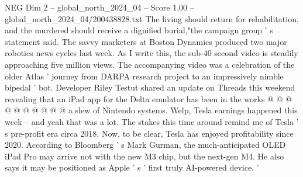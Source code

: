 \begin{textsample}{NEG Dim 2 – global\_north\_2024\_04 – Score 1.00 – global\_north\_2024\_04/200438828.txt}
The living should return for rehabilitation, and the murdered should receive a dignified burial,"the campaign group ' s statement said.
The savvy marketers at Boston Dynamics produced two major robotics news cycles last week.
As I write this, the sub-40 second video is steadily approaching five million views.
The accompanying video was a celebration of the older Atlas ' journey from DARPA research project to an impressively nimble bipedal ' bot.
Developer Riley Testut shared an update on Threads this weekend revealing that an iPad app for the Delta emulator has been in the works @ @ @ @ @ @ @ @ @ @ a slew of Nintendo systems.
Welp, Tesla earnings happened this week -- and yeah that was a lot.
The stakes this time around remind me of Tesla ' s pre-profit era circa 2018.
Now, to be clear, Tesla has enjoyed profitability since 2020.
According to Bloomberg ' s Mark Gurman, the much-anticipated OLED iPad Pro may arrive not with the new M3 chip, but the next-gen M4.
He also says it may be positioned as Apple ' s ' first truly AI-powered device. '

\end{textsample}
